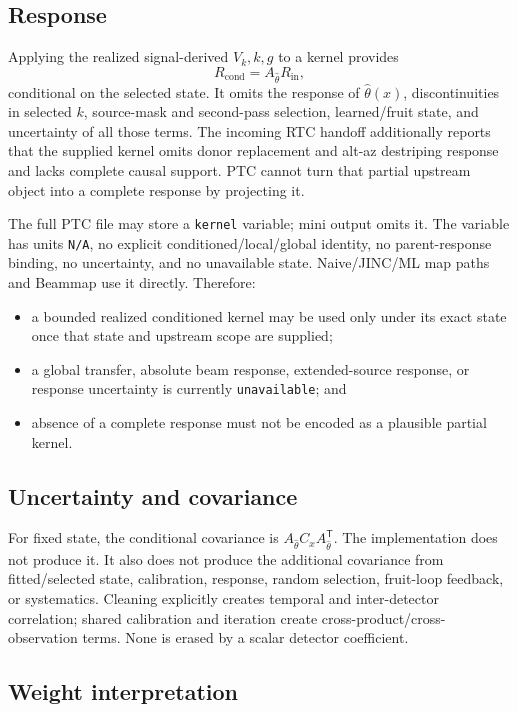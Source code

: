 \documentclass[11pt]{article}
\newcommand{\code}[1]{\nolinkurl{#1}}
\newcommand{\unknown}{\texttt{unavailable}}
\begin{document}
\subsection{Response}

Applying the realized signal-derived \(V_k,k,g\) to a kernel provides
\[
  R_{\mathrm{cond}}=A_{\widehat\theta}R_{\mathrm{in}},
\]
conditional on the selected state.  It omits the response of
\(\widehat\theta(x)\), discontinuities in selected \(k\), source-mask and
second-pass selection, learned/fruit state, and uncertainty of all those
terms.  The incoming RTC handoff additionally reports that the supplied
kernel omits donor replacement and alt-az destriping response and lacks
complete causal support.  PTC cannot turn that partial upstream object into a
complete response by projecting it.

The full PTC file may store a \code{kernel} variable; mini output omits it.
The variable has units \code{N/A}, no explicit conditioned/local/global
identity, no parent-response binding, no uncertainty, and no unavailable
state.  Naive/JINC/ML map paths and Beammap use it directly.  Therefore:
\begin{itemize}[leftmargin=*]
\item a bounded realized conditioned kernel may be used only under its exact
state once that state and upstream scope are supplied;
\item a global transfer, absolute beam response, extended-source response, or
response uncertainty is currently \unknown{}; and
\item absence of a complete response must not be encoded as a plausible
partial kernel.
\end{itemize}

\subsection{Uncertainty and covariance}

For fixed state, the conditional covariance is
\(A_{\widehat\theta}C_xA_{\widehat\theta}^{\mathsf T}\).  The implementation
does not produce it.  It also does not produce the additional covariance from
fitted/selected state, calibration, response, random selection, fruit-loop
feedback, or systematics.  Cleaning explicitly creates temporal and
inter-detector correlation; shared calibration and iteration create
cross-product/cross-observation terms.  None is erased by a scalar detector
coefficient.

\subsection{Weight interpretation}
\end{document}
